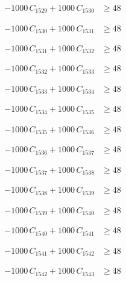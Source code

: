 \documentclass[a4paper,11pt]{article}
\begin{document}
\begin{align}
-1000\,C_{1529} + 1000\,C_{1530} &\geq 48 \nonumber
\end{align}

\begin{align}
-1000\,C_{1530} + 1000\,C_{1531} &\geq 48 \nonumber
\end{align}

\begin{align}
-1000\,C_{1531} + 1000\,C_{1532} &\geq 48 \nonumber
\end{align}

\begin{align}
-1000\,C_{1532} + 1000\,C_{1533} &\geq 48 \nonumber
\end{align}

\begin{align}
-1000\,C_{1533} + 1000\,C_{1534} &\geq 48 \nonumber
\end{align}

\begin{align}
-1000\,C_{1534} + 1000\,C_{1535} &\geq 48 \nonumber
\end{align}

\begin{align}
-1000\,C_{1535} + 1000\,C_{1536} &\geq 48 \nonumber
\end{align}

\begin{align}
-1000\,C_{1536} + 1000\,C_{1537} &\geq 48 \nonumber
\end{align}

\begin{align}
-1000\,C_{1537} + 1000\,C_{1538} &\geq 48 \nonumber
\end{align}

\begin{align}
-1000\,C_{1538} + 1000\,C_{1539} &\geq 48 \nonumber
\end{align}

\begin{align}
-1000\,C_{1539} + 1000\,C_{1540} &\geq 48 \nonumber
\end{align}

\begin{align}
-1000\,C_{1540} + 1000\,C_{1541} &\geq 48 \nonumber
\end{align}

\begin{align}
-1000\,C_{1541} + 1000\,C_{1542} &\geq 48 \nonumber
\end{align}

\begin{align}
-1000\,C_{1542} + 1000\,C_{1543} &\geq 48 \nonumber
\end{align}
\end{document}
